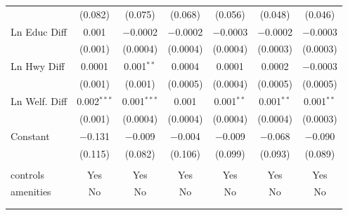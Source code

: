 \begin{table}[!htbp]
\begin{tabular}{@{\extracolsep{5pt}}lcccccc}
  & (0.082) & (0.075) & (0.068) & (0.056) & (0.048) & (0.046) \\ 
  Ln Educ Diff & 0.001 & $-$0.0002 & $-$0.0002 & $-$0.0003 & $-$0.0002 & $-$0.0003 \\ 
  & (0.001) & (0.0004) & (0.0004) & (0.0004) & (0.0003) & (0.0003) \\ 
  Ln Hwy Diff & 0.0001 & 0.001$^{**}$ & 0.0004 & 0.0001 & 0.0002 & $-$0.0003 \\ 
  & (0.001) & (0.001) & (0.0005) & (0.0004) & (0.0005) & (0.0005) \\ 
  Ln Welf. Diff & 0.002$^{***}$ & 0.001$^{***}$ & 0.001 & 0.001$^{**}$ & 0.001$^{**}$ & 0.001$^{**}$ \\ 
  & (0.001) & (0.0004) & (0.0004) & (0.0004) & (0.0004) & (0.0003) \\ 
  Constant & $-$0.131 & $-$0.009 & $-$0.004 & $-$0.009 & $-$0.068 & $-$0.090 \\ 
  & (0.115) & (0.082) & (0.106) & (0.099) & (0.093) & (0.089) \\ 
 \hline \\[-1.8ex] 
controls & Yes & Yes & Yes & Yes & Yes & Yes \\ 
amenities & No & No & No & No & No & No \\ 
\hline \\[-1.8ex] 
\hline 
\hline \\[-1.8ex] 
\end{tabular} 
\end{table} 
